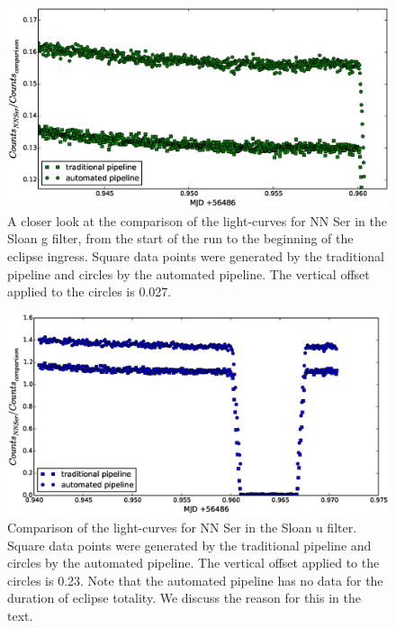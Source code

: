 \begin{figure}
\centering
\includegraphics[width=140mm]{images/nn_ser_compare_zoom_g.eps}
\caption{A closer look at the comparison of the light-curves for NN Ser in the Sloan g filter, from the start of the run to the beginning of the eclipse ingress. Square data points were generated by the traditional pipeline and circles by the automated pipeline. The vertical offset applied to the circles is 0.027. }
\label{fig:comparepipelines_zoom_g}
\end{figure}

\begin{figure}
\centering
\includegraphics[width=140mm]{images/nn_ser_compare_b.eps}
\caption{Comparison of the light-curves for NN Ser in the Sloan u filter. Square data points were generated by the traditional pipeline and circles by the automated pipeline. The vertical offset applied to the circles is 0.23. Note that the automated pipeline has no data for the duration of eclipse totality. We discuss the reason for this in the text.}
\label{fig:comparepipelines_b}
\end{figure}

